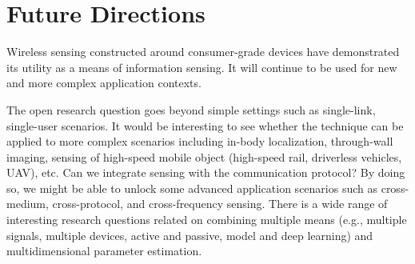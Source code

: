 \section{Future Directions}

Wireless sensing constructed around consumer-grade devices have demonstrated its utility as a means of information sensing. It will
continue to be used for new and more complex application contexts.

The open research question goes beyond simple settings such as single-link, single-user scenarios. It would be interesting to see whether
the technique can be applied to more complex scenarios including in-body localization, through-wall imaging, sensing of high-speed mobile
object (high-speed rail, driverless vehicles, UAV), etc. Can we integrate sensing with the communication protocol? By doing so, we might be
able to unlock some advanced application scenarios such as cross-medium, cross-protocol, and cross-frequency sensing. There is a wide range
of interesting research questions related on combining multiple means (e.g., multiple signals, multiple devices, active and passive, model
and deep learning) and multidimensional parameter estimation.
